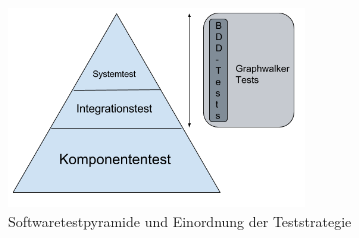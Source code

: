 \begin{figure}[h] 
  \centering
     \includegraphics[width=0.7\textwidth]{figures/pyramide_mbt_bdd.png}
  \caption{Softwaretestpyramide und Einordnung der Teststrategie}
  \label{fig:pyramide}
\end{figure}

